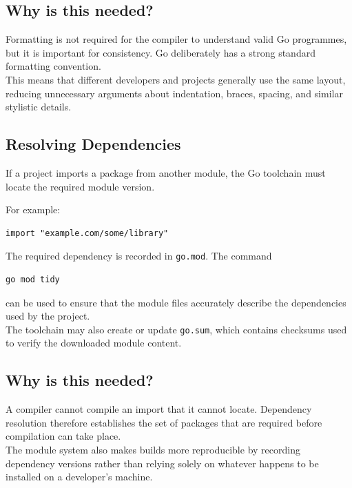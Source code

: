 \subsection*{Why is this needed?}

Formatting is not required for the compiler to understand valid Go
programmes, but it is important for consistency.  Go deliberately has a
strong standard formatting convention.\\

This means that different developers and projects generally use the
same layout, reducing unnecessary arguments about indentation,
braces, spacing, and similar stylistic details.

\subsection{Resolving Dependencies}

If a project imports a package from another module, the Go toolchain
must locate the required module version.

For example:

\begin{lstlisting}
import "example.com/some/library"
\end{lstlisting}

The required dependency is recorded in \texttt{go.mod}.  The command

\begin{lstlisting}
go mod tidy
\end{lstlisting}

can be used to ensure that the module files accurately describe the
dependencies used by the project.\\

The toolchain may also create or update \texttt{go.sum}, which contains
checksums used to verify the downloaded module content.

\subsection*{Why is this needed?}

A compiler cannot compile an import that it cannot locate.  Dependency
resolution therefore establishes the set of packages that are required
before compilation can take place.\\

The module system also makes builds more reproducible by recording
dependency versions rather than relying solely on whatever happens to
be installed on a developer's machine.

